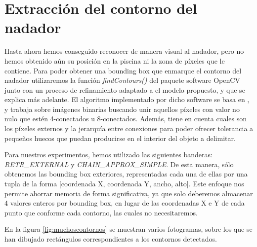 \section{Extracción del contorno del nadador}
\label{sec:Extraccion_contorno}
Hasta ahora hemos conseguido reconocer de manera visual al nadador, pero no hemos obtenido aún su posición en la piscina ni la zona de píxeles que le contiene. Para poder obtener una bounding box que enmarque el contorno del nadador utilizaremos la función \textit{findContours()} del paquete software OpenCV junto con un proceso de refinamiento adaptado a el modelo propuesto, y que se explica más adelante. El algoritmo implementado por dicho software se basa en \cite{contornosalgor}, y trabaja sobre imágenes binarias buscando unir aquellos píxeles con valor no nulo que estén 4-conectados u 8-conectados. Además, tiene en cuenta cuales son los píxeles externos y la jerarquía entre conexiones para poder ofrecer tolerancia a pequeños huecos que puedan producirse en el interior del objeto a delimitar.

Para nuestros experimentos, hemos utilizado las siguientes banderas: \\\textit{RETR\_EXTERNAL} y \textit{CHAIN\_APPROX\_SIMPLE}. De esta manera, sólo obtenemos las bounding box exteriores, representadas cada una de ellas por una tupla de la forma [coordenada X, coordenada Y, ancho, alto]. Este enfoque nos permite ahorrar memoria de forma significativa, ya que solo deberemos almacenar 4 valores enteros por bounding box, en lugar de las coordenadas X e Y de cada punto que conforme cada contorno, las cuales no necesitaremos.

En la figura \ref{fig:muchoscontornos} se muestran varios fotogramas, sobre los que se han dibujado rectángulos correspondientes a los contornos detectados.

